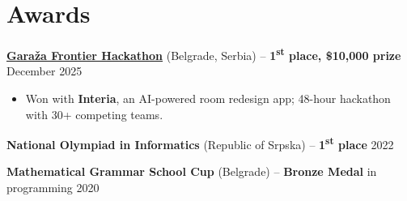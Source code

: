 \documentclass[11pt,letterpaper]{article}
\begin{document}
\vspace{-0.4cm}

\section*{Awards}

\textbf{\href{https://hack.garaza.org/}{Garaža Frontier Hackathon}} (Belgrade, Serbia) -- \textbf{1\textsuperscript{st} place, \$10,000 prize} \hfill December 2025
\begin{itemize}[noitemsep,topsep=2pt,leftmargin=*]
    \item Won with \textbf{Interia}, an AI-powered room redesign app; 48-hour hackathon with 30+ competing teams.
    
\end{itemize}

\textbf{National Olympiad in Informatics} (Republic of Srpska) -- \textbf{1\textsuperscript{st} place} \hfill 2022

\textbf{Mathematical Grammar School Cup} (Belgrade) -- \textbf{Bronze Medal} in programming \hfill 2020
\end{document}
